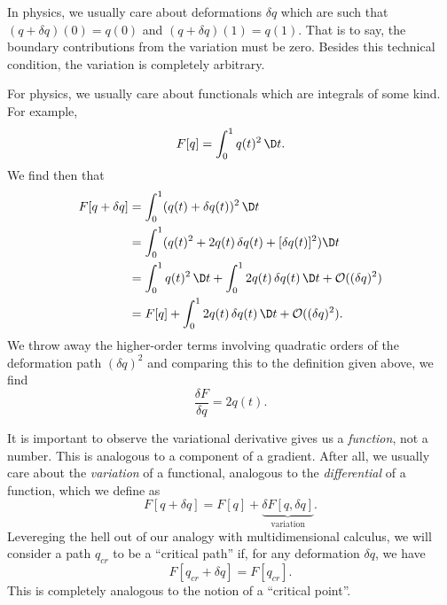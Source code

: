 In physics, we usually care about deformations $\delta q$ which are such
that $(q + \delta q)(0) = q(0)$ and $(q + \delta q)(1)=q(1)$. That is to
say, the boundary contributions from the variation must be zero. Besides
this technical condition, the variation is completely arbitrary. 

\begin{example}
For physics, we usually care about functionals which are integrals of
some kind. For example,
\begin{equation}
F[q] = \int^{1}_{0}q(t)^{2}\,\D t.
\end{equation}
We find then that
\begin{subequations}
\begin{align}
F[q + \delta q] &= \int^{1}_{0}(q(t) + \delta q(t))^{2}\,\D t\\
&= \int^{1}_{0}(q(t)^{2} + 2q(t)\,\delta q(t) + [\delta q(t)]^{2})\D t\\
&= \int^{1}_{0}q(t)^{2}\,\D t + \int^{1}_{0}2q(t)\,\delta q(t)\,\D t +
\mathcal{O}((\delta q)^{2})\\
&= F[q] + \int^{1}_{0}2q(t)\,\delta q(t)\,\D t +
\mathcal{O}((\delta q)^{2}).
\end{align}
\end{subequations}
We throw away the higher-order terms involving quadratic orders of the
deformation path $(\delta q)^2$ and comparing this to the definition
given above, we find
\begin{equation}
\frac{\delta F}{\delta q} = 2q(t).
\end{equation}
\end{example}

\begin{remark}
It is important to observe the variational derivative gives us a
\emph{function}, not a number. This is analogous to a component of a
gradient. After all, we usually care about the \emph{variation} of a
functional, analogous to the \emph{differential} of a function, which
we define as
\begin{equation}
F[q + \delta q] = F[q] + \underbrace{\delta F[q, \delta q]}_{\text{variation}}.
\end{equation}
Levereging the hell out of our analogy with multidimensional calculus,
we will consider a path $q_{cr}$ to be a ``critical path'' if, for any
deformation $\delta q$, we have
\begin{equation}
F[q_{cr} + \delta q] = F[q_{cr}].
\end{equation}
This is completely analogous to the notion of a ``critical point''.
\end{remark}


